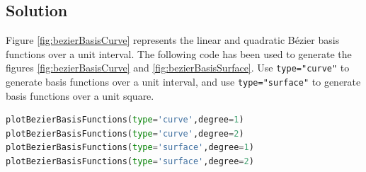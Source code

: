 \documentclass[a4paper, 11pt]{article}
\begin{document}
\begin{enumerate}
\begin{enumerate}[label=\alph*.]
    \subsection*{Solution}
    Figure \ref{fig:bezierBasisCurve} represents the linear and quadratic B\'{e}zier basis functions over a unit interval. The following code has been used to generate the figures \ref{fig:bezierBasisCurve} and \ref{fig:bezierBasisSurface}. Use \texttt{type="curve"} to generate basis functions over a unit interval, and use \texttt{type="surface"} to generate basis functions over a unit square.
    \begin{lstlisting}[language=Python]
plotBezierBasisFunctions(type='curve',degree=1)
plotBezierBasisFunctions(type='curve',degree=2)
plotBezierBasisFunctions(type='surface',degree=1)
plotBezierBasisFunctions(type='surface',degree=2)
\end{lstlisting} 
    \begin{figure}[ht] 
 \quad 
\end{figure}
\end{enumerate}
\end{enumerate}
\end{document}
